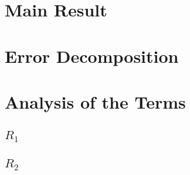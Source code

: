 \section{Main Result}
  
\section{Error Decomposition}
  
\section{Analysis of the Terms}
  \subsection{$R_1$}
    
  \subsection{$R_2$}
    
